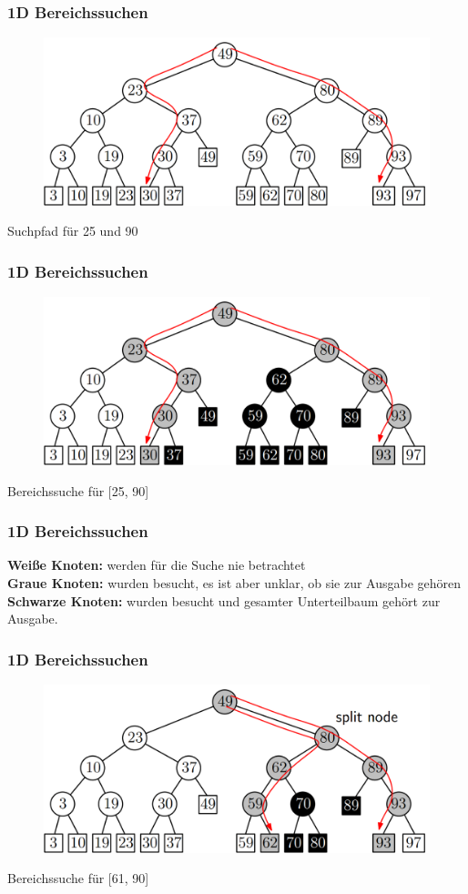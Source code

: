 \begin{frame}
	\frametitle{{1D Bereichssuchen}}
\begin{figure}[htbp]
	\begin{center}
  	\includegraphics[width=.8\linewidth]{bilder/1d3}
	\end{center}
\end{figure}
Suchpfad für 25 und 90
\end{frame}

\begin{frame}
	\frametitle{{1D Bereichssuchen}}
\begin{figure}[htbp]
	\begin{center}
  	\includegraphics[width=.8\linewidth]{bilder/1d4}
	\end{center}
\end{figure}
Bereichssuche für [25, 90]
\end{frame}

\begin{frame}
	\frametitle{{1D Bereichssuchen}}
	\textbf{Weiße Knoten: } werden für die Suche nie betrachtet\\
	\textbf{Graue Knoten: } wurden besucht, es ist aber unklar, ob sie zur Ausgabe gehören\\
	\textbf{Schwarze Knoten: } wurden besucht und gesamter Unterteilbaum gehört zur Ausgabe.
\end{frame}

\begin{frame}
	\frametitle{{1D Bereichssuchen}}
\begin{figure}[htbp]
	\begin{center}
  	\includegraphics[width=.8\linewidth]{bilder/1d5}
	\end{center}
\end{figure}
Bereichssuche für [61, 90]
\end{frame}


